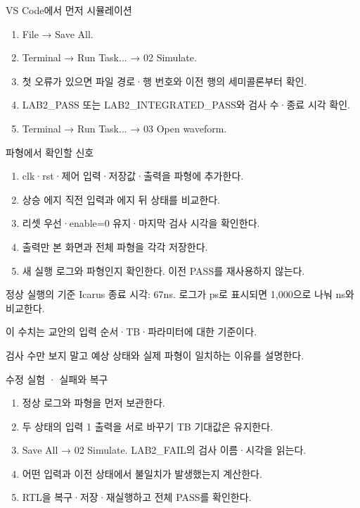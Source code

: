 \begin{frame}[label=simulation]{VS Code에서 먼저 시뮬레이션}
\small
\begin{enumerate}
\item File → Save All.
\item Terminal → Run Task... → 02 Simulate.
\item 첫 오류가 있으면 파일 경로·행 번호와 이전 행의 세미콜론부터 확인.
\item LAB2\_PASS 또는 LAB2\_INTEGRATED\_PASS와 검사 수·종료 시각 확인.
\item Terminal → Run Task... → 03 Open waveform.
\end{enumerate}
\end{frame}

\begin{frame}{파형에서 확인할 신호}
\small
\begin{enumerate}
\item clk·rst·제어 입력·저장값·출력을 파형에 추가한다.
\item 상승 에지 직전 입력과 에지 뒤 상태를 비교한다.
\item 리셋 우선·enable=0 유지·마지막 검사 시각을 확인한다.
\item 출력만 본 화면과 전체 파형을 각각 저장한다.
\item 새 실행 로그와 파형인지 확인한다. 이전 PASS를 재사용하지 않는다.
\end{enumerate}
\end{frame}

\begin{frame}{정상 실행의 기준}
\small
{}Icarus 종료 시각: 67ns. 로그가 ps로 표시되면 1,000으로 나눠 ns와 비교한다.\par\vspace{0.26cm}이 수치는 교안의 입력 순서·TB·파라미터에 대한 기준이다.\par\vspace{0.26cm}검사 수만 보지 말고 예상 상태와 실제 파형이 일치하는 이유를 설명한다.\par
\end{frame}

\begin{frame}{수정 실험 · 실패와 복구}
\small
\begin{enumerate}
\item 정상 로그와 파형을 먼저 보관한다.
\item 두 상태의 입력 1 출력을 서로 바꾸기 TB 기대값은 유지한다.
\item Save All → 02 Simulate. LAB2\_FAIL의 검사 이름·시각을 읽는다.
\item 어떤 입력과 이전 상태에서 불일치가 발생했는지 계산한다.
\item RTL을 복구·저장·재실행하고 전체 PASS를 확인한다.
\end{enumerate}
\end{frame}

